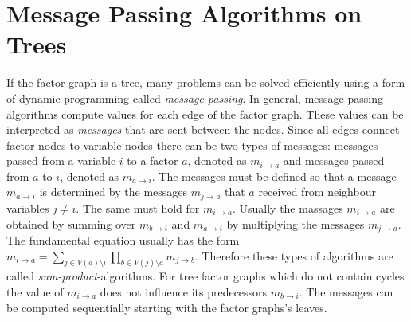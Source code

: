 \section{Message Passing Algorithms on Trees}

If the factor graph is a tree, many problems can be solved efficiently using a form of dynamic programming called \emph{message passing}. \newline 
In general, message passing algorithms compute values for each edge of the factor graph. These values can be interpreted as \emph{messages} that are sent between the nodes. Since all edges connect factor nodes to variable nodes there can be two types of messages: messages passed from a variable $i$ to a factor $a$, denoted as $m_{i \rightarrow a}$ and messages passed from $a$ to $i$, denoted as $m_{a \rightarrow i}$. \newline
The messages must be defined so that a message $m_{a \rightarrow i}$ is determined by the messages $m_{j \rightarrow a}$ that $a$ received from neighbour variables $j \neq i$. 
The same must hold for $m_{i \rightarrow a}$. \newline
Usually the massages $m_{i \rightarrow a}$ are obtained by summing over $m_{b \rightarrow i}$ and $m_{a \rightarrow i}$ by multiplying the messages $m_{j \rightarrow a}$. The fundamental equation usually has the form $m_{i \rightarrow a} = \sum_{j \in V(a) \setminus i} \prod_{b \in V(j) \setminus a} m_{j \rightarrow b}$. Therefore these types of algorithms are called \emph{sum-product}-algorithms. \newline
For tree factor graphs which do not contain cycles the value of $m_{i \rightarrow a}$ does not influence its predecessors $m_{b \rightarrow i}$. The messages can be computed sequentially starting with the factor graphs's leaves.


